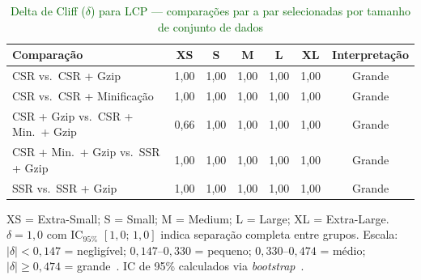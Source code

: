 \begin{table}[!ht]
\centering
\footnotesize
\caption{\textcolor{darkgreen}{Delta de Cliff ($\delta$) para LCP — comparações par a par selecionadas por tamanho de conjunto de dados}}
\label{tab:cliffs-delta}
\begin{tabular}{|l|c|c|c|c|c|c|}
\hline
\textbf{Comparação} & \textbf{XS} & \textbf{S} & \textbf{M} & \textbf{L} & \textbf{XL} & \textbf{Interpretação} \\
\hline
CSR vs.\ CSR + Gzip               & 1,00 & 1,00 & 1,00 & 1,00 & 1,00 & Grande \\
CSR vs.\ CSR + Minificação        & 1,00 & 1,00 & 1,00 & 1,00 & 1,00 & Grande \\
CSR + Gzip vs.\ CSR + Min.\ + Gzip & 0,66 & 1,00 & 1,00 & 1,00 & 1,00 & Grande \\
CSR + Min.\ + Gzip vs.\ SSR + Gzip & 1,00 & 1,00 & 1,00 & 1,00 & 1,00 & Grande \\
SSR vs.\ SSR + Gzip               & 1,00 & 1,00 & 1,00 & 1,00 & 1,00 & Grande \\
\hline
\end{tabular}
\vspace{2pt}
\begin{flushleft}
\footnotesize
XS = Extra-Small; S = Small; M = Medium; L = Large; XL = Extra-Large.
$\delta = 1{,}0$ com IC$_{95\%}$ $[1{,}0;\,1{,}0]$ indica separação completa entre grupos.
Escala: $|\delta| < 0{,}147$ = negligível; $0{,}147$--$0{,}330$ = pequeno; $0{,}330$--$0{,}474$ = médio; $|\delta| \geq 0{,}474$ = grande~\cite{Romano2006}.
IC de 95\% calculados via \textit{bootstrap}~\cite{efron:1994}.
\end{flushleft}
\end{table}
